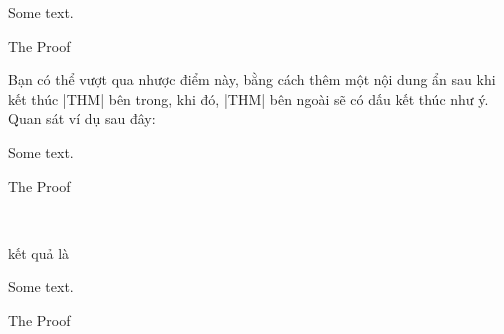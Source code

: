 \begin{itemize}
\begin{thmbox}
 \begin{Lemma}
   Some text.
   \begin{Proof} The Proof \end{Proof}
 \end{Lemma}
\end{thmbox}

Bạn có thể vượt qua nhược điểm này, bằng cách thêm một nội dung ẩn
sau khi kết thúc |THM| bên trong, khi đó, |THM| bên ngoài sẽ có dấu
kết thúc như ý. Quan sát ví dụ sau đây:
\begin{example}
  \begin{Lemma}
   Some text.
   \begin{Proof}
   	The Proof
   \end{Proof}~
  \end{Lemma}
\end{example}
kết quả là

\begin{thmbox}
 \begin{Lemma}
  Some text.
  \begin{Proof} The Proof \end{Proof}~
 \end{Lemma}
\end{thmbox}


\end{itemize}
